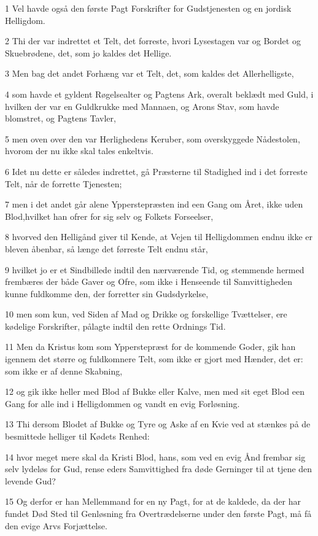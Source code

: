 \par 1 Vel havde også den første Pagt Forskrifter for Gudstjenesten og en jordisk Helligdom.
\par 2 Thi der var indrettet et Telt, det forreste, hvori Lysestagen var og Bordet og Skuebrødene, det, som jo kaldes det Hellige.
\par 3 Men bag det andet Forhæng var et Telt, det, som kaldes det Allerhelligste,
\par 4 som havde et gyldent Røgelsealter og Pagtens Ark, overalt beklædt med Guld, i hvilken der var en Guldkrukke med Mannaen, og Arons Stav, som havde blomstret, og Pagtens Tavler,
\par 5 men oven over den var Herlighedens Keruber, som overskyggede Nådestolen, hvorom der nu ikke skal tales enkeltvis.
\par 6 Idet nu dette er således indrettet, gå Præsterne til Stadighed ind i det forreste Telt, når de forrette Tjenesten;
\par 7 men i det andet går alene Ypperstepræsten ind een Gang om Året, ikke uden Blod,hvilket han ofrer for sig selv og Folkets Forseelser,
\par 8 hvorved den Helligånd giver til Kende, at Vejen til Helligdommen endnu ikke er bleven åbenbar, så længe det førreste Telt endnu står,
\par 9 hvilket jo er et Sindbillede indtil den nærværende Tid, og stemmende hermed frembæres der både Gaver og Ofre, som ikke i Henseende til Samvittigheden kunne fuldkomme den, der forretter sin Gudsdyrkelse,
\par 10 men som kun, ved Siden af Mad og Drikke og forskellige Tvættelser, ere kødelige Forskrifter, pålagte indtil den rette Ordnings Tid.
\par 11 Men da Kristus kom som Ypperstepræst for de kommende Goder, gik han igennem det større og fuldkomnere Telt, som ikke er gjort med Hænder, det er: som ikke er af denne Skabning,
\par 12 og gik ikke heller med Blod af Bukke eller Kalve, men med sit eget Blod een Gang for alle ind i Helligdommen og vandt en evig Forløsning.
\par 13 Thi dersom Blodet af Bukke og Tyre og Aske af en Kvie ved at stænkes på de besmittede helliger til Kødets Renhed:
\par 14 hvor meget mere skal da Kristi Blod, hans, som ved en evig Ånd frembar sig selv lydeløs for Gud, rense eders Samvittighed fra døde Gerninger til at tjene den levende Gud?
\par 15 Og derfor er han Mellemmand for en ny Pagt, for at de kaldede, da der har fundet Død Sted til Genløsning fra Overtrædelserne under den første Pagt, må få den evige Arvs Forjættelse.
